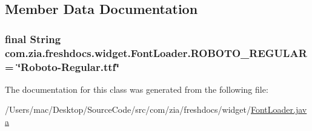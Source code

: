\subsection{Member Data Documentation}
\hypertarget{classcom_1_1zia_1_1freshdocs_1_1widget_1_1_font_loader_a111f3e552746be1788bf7ce480f338f5}{
\subsubsection[{R\-O\-B\-O\-T\-O\-\_\-\-R\-E\-G\-U\-L\-A\-R}]{\setlength{\rightskip}{0pt plus 5cm}final String com.\-zia.\-freshdocs.\-widget.\-Font\-Loader.\-R\-O\-B\-O\-T\-O\-\_\-\-R\-E\-G\-U\-L\-A\-R = \char`\"{}Roboto-\/Regular.\-ttf\char`\"{}\hspace{0.3cm}{\ttfamily [static]}}}\label{classcom_1_1zia_1_1freshdocs_1_1widget_1_1_font_loader_a111f3e552746be1788bf7ce480f338f5}


The documentation for this class was generated from the following file\-:\begin{DoxyCompactItemize}
\item 
/\-Users/mac/\-Desktop/\-Source\-Code/src/com/zia/freshdocs/widget/\hyperlink{_font_loader_8java}{Font\-Loader.\-java}\end{DoxyCompactItemize}
